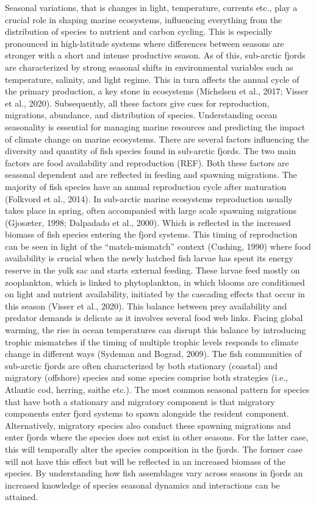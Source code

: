 \documentclass[12pt]{article}
\begin{document}
Seasonal variations, that is changes in light, temperature, currents etc., play a crucial role in shaping marine ecosystems, influencing everything from the distribution of species to nutrient and carbon cycling. This is especially pronounced in high-latitude systems where differences between seasons are stronger with a short and intense productive season. As of this, sub-arctic fjords are characterized by strong seasonal shifts in environmental variables such as temperature, salinity, and light regime. This in turn affects the annual cycle of the primary production, a key stone in ecosystems (Michelsen et al., 2017; Visser et al., 2020). Subsequently, all these factors give cues for reproduction, migrations, abundance, and distribution of species. Understanding ocean seasonality is essential for managing marine resources and predicting the impact of climate change on marine ecosystems.
There are several factors influencing the diversity and quantity of fish species found in sub-arctic fjords. The two main factors are food availability and reproduction (REF). Both these factors are seasonal dependent and are reflected in feeding and spawning migrations.
The majority of fish species have an annual reproduction cycle after maturation (Folkvord et al., 2014). In sub-arctic marine ecosystems reproduction usually takes place in spring, often accompanied with large scale spawning migrations (Gjosæter, 1998; Dalpadado et al., 2000). Which is reflected in the increased biomass of fish species entering the fjord systems. This timing of reproduction can be seen in light of the “match-mismatch” context (Cushing, 1990) where food availability is crucial when the newly hatched fish larvae has spent its energy reserve in the yolk sac and starts external feeding. These larvae feed mostly on zooplankton, which is linked to phytoplankton, in which blooms are conditioned on light and nutrient availability, initiated by the cascading effects that occur in this season (Visser et al., 2020). This balance between prey availability and predator demands is delicate as it involves several food web links. Facing global warming, the rise in ocean temperatures can disrupt this balance by introducing trophic mismatches if the timing of multiple trophic levels responds to climate change in different ways (Sydeman and Bograd, 2009).
The fish communities of sub-arctic fjords are often characterized by both stationary (coastal) and migratory (offshore) species and some species comprise both strategies (i.e., Atlantic cod, herring, saithe etc.). The most common seasonal pattern for species that have both a stationary and migratory component is that migratory components enter fjord systems to spawn alongside the resident component. Alternatively, migratory species also conduct these spawning migrations and enter fjords where the species does not exist in other seasons. For the latter case, this will temporally alter the species composition in the fjords. The former case will not have this effect but will be reflected in an increased biomass of the species. By understanding how fish assemblages vary across seasons in fjords an increased knowledge of species seasonal dynamics and interactions can be attained.   
\end{document}
